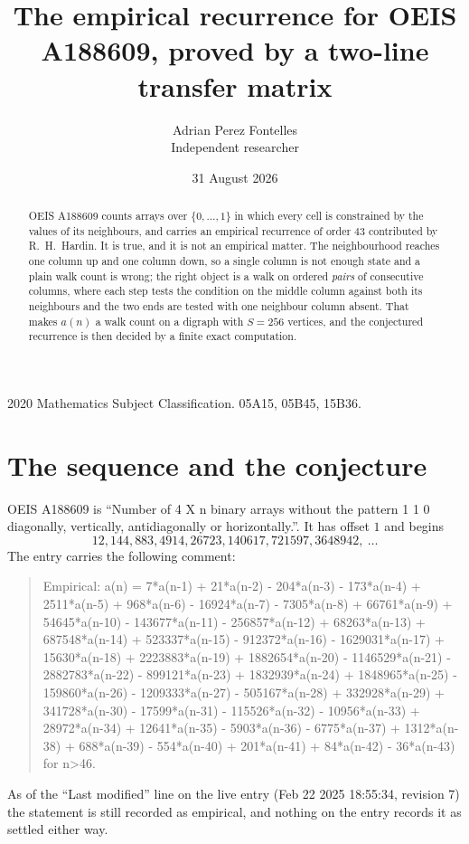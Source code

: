 \documentclass[11pt,a4paper]{article}
\title{The empirical recurrence for OEIS A188609, proved by a two-line transfer matrix}
\author{Adrian Perez Fontelles\\ \small Independent researcher}
\date{31 August 2026}
\theoremstyle{plain}
\theoremstyle{definition}
\begin{document}
\maketitle

\begin{abstract}
OEIS A188609 counts arrays over $\{0,\dots,1\}$ in which every cell is constrained by the
values of its neighbours, and carries an empirical recurrence of order $43$ contributed
by R.~H.~Hardin. It is true, and it is not an empirical matter. The neighbourhood reaches one
column up and one column down, so a single column is not enough state and a plain walk count
is wrong; the right object is a walk on ordered \emph{pairs} of consecutive columns, where
each step tests the condition on the middle column against both its neighbours and the two
ends are tested with one neighbour column absent. That makes $a(n)$ a walk count on a digraph
with $S=256$ vertices, and the conjectured recurrence is then decided by a finite exact
computation.
\end{abstract}

\noindent\small 2020 Mathematics Subject Classification. 05A15, 05B45, 15B36.\normalsize

\section{The sequence and the conjecture}

OEIS A188609 is ``Number of 4 X n binary arrays without the pattern 1 1 0 diagonally, vertically, antidiagonally or horizontally.''. It has offset $1$ and begins
\[
12, 144, 883, 4914, 26723, 140617, 721597, 3648942,\ \dots
\]
The entry carries the following comment:
\begin{quote}\small
Empirical: a(n) = 7*a(n-1) + 21*a(n-2) - 204*a(n-3) - 173*a(n-4) + 2511*a(n-5) + 968*a(n-6) - 16924*a(n-7) - 7305*a(n-8) + 66761*a(n-9) + 54645*a(n-10) - 143677*a(n-11) - 256857*a(n-12) + 68263*a(n-13) + 687548*a(n-14) + 523337*a(n-15) - 912372*a(n-16) - 1629031*a(n-17) + 15630*a(n-18) + 2223883*a(n-19) + 1882654*a(n-20) - 1146529*a(n-21) - 2882783*a(n-22) - 899121*a(n-23) + 1832939*a(n-24) + 1848965*a(n-25) - 159860*a(n-26) - 1209333*a(n-27) - 505167*a(n-28) + 332928*a(n-29) + 341728*a(n-30) - 17599*a(n-31) - 115526*a(n-32) - 10956*a(n-33) + 28972*a(n-34) + 12641*a(n-35) - 5903*a(n-36) - 6775*a(n-37) + 1312*a(n-38) + 688*a(n-39) - 554*a(n-40) + 201*a(n-41) + 84*a(n-42) - 36*a(n-43) for n>46.
\end{quote}
As of the ``Last modified'' line on the live entry (Feb 22 2025 18:55:34, revision 7) the statement is
still recorded as empirical, and nothing on the entry records it as settled either way.
\end{document}

